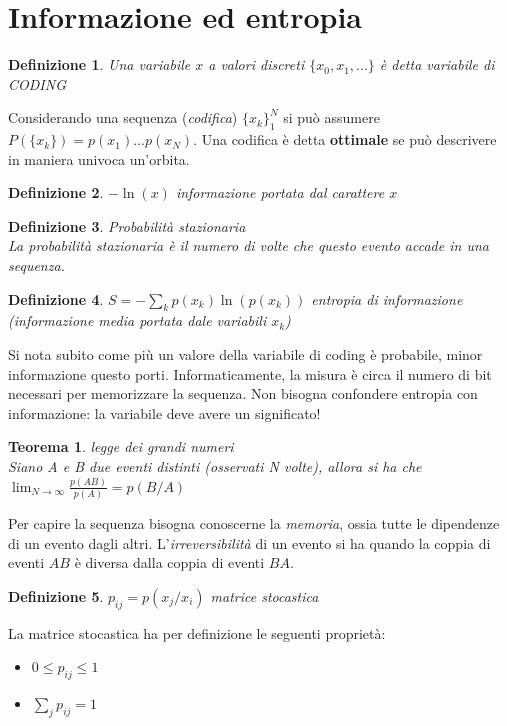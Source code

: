 \documentclass[12pt, a4paper]{article}
\theoremstyle{theorem}
\newtheorem{definition}{Definizione}[section]
\newtheorem{theorem}{Teorema}[section]
\begin{document}
	\section{Informazione ed entropia}
		\begin{definition}
			Una variabile $x$ a valori discreti $\{x_0,x_1,...\}$ è detta variabile di CODING
		\end{definition}
		Considerando una sequenza (\textit{codifica}) $\{x_k\}_1^N$ si può assumere $P(\{x_k\})=p(x_1)...p(x_N)$.
		Una codifica è detta \textbf{ottimale} se può descrivere in maniera univoca un'orbita.
		\begin{definition}
			$-\ln(x)$ informazione portata dal carattere $x$
		\end{definition}
		\begin{definition}
			Probabilità stazionaria\\
			La probabilità stazionaria è il numero di volte che questo evento accade in una sequenza.
		\end{definition}
		\begin{definition}
			$S=-\sum_kp(x_k)\ln(p(x_k))$ entropia di informazione (informazione media portata dale variabili $x_k$)
		\end{definition}
		Si nota subito come più un valore della variabile di coding è probabile, minor informazione questo porti.
		Informaticamente, la misura è circa il numero di bit necessari per memorizzare la sequenza.
		Non bisogna confondere entropia con informazione: la variabile deve avere un significato!
		\begin{theorem}
			legge dei grandi numeri\\
			Siano A e B due eventi distinti (osservati N volte), allora si ha che\\
			$\lim_{N\to\infty}\frac{p(AB)}{p(A)}=p(B/A)$
		\end{theorem}
		Per capire la sequenza bisogna conoscerne la \textit{memoria}, ossia tutte le dipendenze di un evento dagli altri.
		L'\textit{irreversibilità} di un evento si ha quando la coppia di eventi $AB$ è diversa dalla coppia di eventi $BA$.
		\begin{definition}
			$p_{ij}=p(x_j/x_i)$ matrice stocastica
		\end{definition}
		La matrice stocastica ha per definizione le seguenti proprietà:
		\begin{itemize}
			\item $0\leq p_{ij}\leq 1$
			\item $\sum_jp_{ij}=1$
		\end{itemize}
\end{document}
